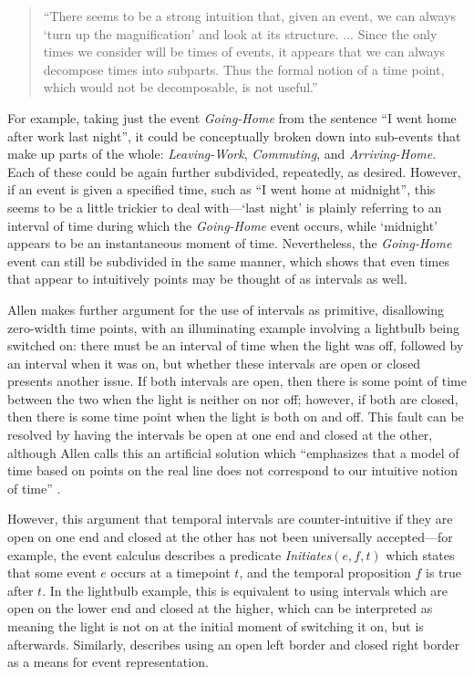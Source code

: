 \documentclass[a4paper,12pt,leqno]{article}
\begin{document}
{
\onehalfspacing
\begin{quotation}
\noindent
``There seems to be a strong intuition that, given an event, we can always `turn up the magnification' and look at its structure. ... Since the only times we consider will be times of events, it appears that we can always decompose times into subparts. Thus the formal notion of a time point, which would not be decomposable, is not useful.'' \citep[p. 834]{allen1983maintaining}
\end{quotation}
}
\noindent
For example, taking just the event \textit{Going-Home} from the sentence ``I went home after work last night'', it could be conceptually broken down into sub-events that make up parts of the whole: \textit{Leaving-Work}, \textit{Commuting}, and \textit{Arriving-Home}. Each of these could be again further subdivided, repeatedly, as desired. However, if an event is given a specified time, such as ``I went home at midnight'', this seems to be a little trickier to deal with---`last night' is plainly referring to an interval of time during which the \textit{Going-Home} event occurs, while `midnight' appears to be an instantaneous moment of time. Nevertheless, the \textit{Going-Home} event can still be subdivided in the same manner, which shows that even times that appear to intuitively points may be thought of as intervals as well.

Allen makes further argument for the use of intervals as primitive, disallowing zero-width time points, with an illuminating example involving a lightbulb being switched on: there must be an interval of time when the light was off, followed by an interval when it was on, but whether these intervals are open or closed presents another issue. If both intervals are open, then there is some point of time between the two when the light is neither on nor off; however, if both are closed, then there is some time point when the light is both on and off. This fault can be resolved by having the intervals be open at one end and closed at the other, although Allen calls this an artificial solution which ``emphasizes that a model of time based on points on the real line does not correspond to our intuitive notion of time'' \citeyearpar[p. 834]{allen1983maintaining}.

However, this argument that temporal intervals are counter-intuitive if they are open on one end and closed at the other has not been universally accepted---for example, the event calculus \citep{Kowalski1986,Miller1999,Mueller2008} describes a predicate \textit{Initiates}$(e, f, t)$ which states that some event $e$ occurs at a timepoint $t$, and the temporal proposition $f$ is true after $t$. In the lightbulb example, this is equivalent to using intervals which are open on the lower end and closed at the higher, which can be interpreted as meaning the light is not on at the initial moment of switching it on, but is afterwards. Similarly, \citet{Fernando2018} describes using an open left border and closed right border as a means for event representation.
\end{document}
